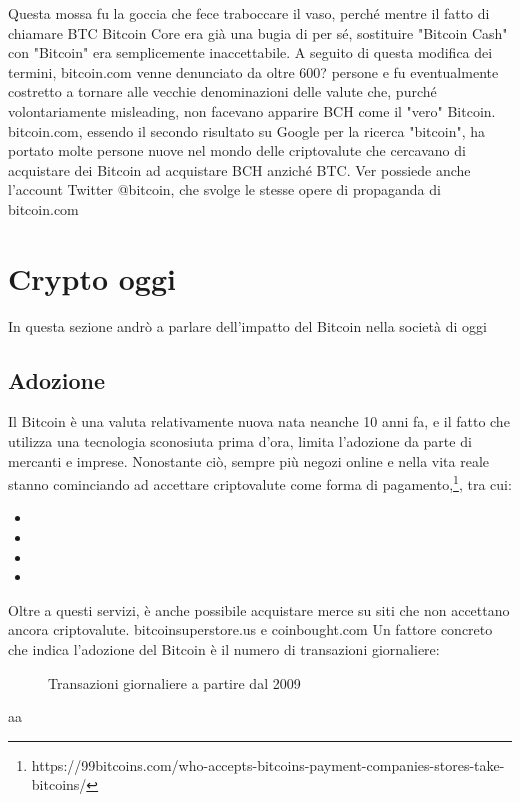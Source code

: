 \documentclass {article}
\begin{document}
{Questa mossa fu la goccia che fece traboccare il vaso, perché mentre il fatto di chiamare BTC Bitcoin Core era già una bugia di per sé, sostituire "Bitcoin Cash" con "Bitcoin" era semplicemente inaccettabile.
A seguito di questa modifica dei termini, bitcoin.com venne denunciato da oltre 600? persone e fu eventualmente costretto a tornare alle vecchie denominazioni delle valute che, purché volontariamente misleading, non facevano apparire BCH come il "vero" Bitcoin.
bitcoin.com, essendo il secondo risultato su Google per la ricerca "bitcoin", ha portato molte persone nuove nel mondo delle criptovalute che cercavano di acquistare dei Bitcoin ad acquistare BCH anziché BTC.
Ver possiede anche l'account Twitter @bitcoin, che svolge le stesse opere di propaganda di bitcoin.com


\section {Crypto oggi}


In questa sezione andrò a parlare dell'impatto del Bitcoin nella società di oggi


\subsection {Adozione}


Il Bitcoin è una valuta relativamente nuova nata neanche 10 anni fa, e il fatto che utilizza una tecnologia sconosiuta prima d'ora, limita l'adozione da parte di mercanti e imprese.
Nonostante ciò, sempre più negozi online e nella vita reale stanno cominciando ad accettare criptovalute come forma di pagamento,\footnote{https://99bitcoins.com/who-accepts-bitcoins-payment-companies-stores-take-bitcoins/}, tra cui:

\begin{itemize}
\item 
\item 
\item 
\item 
\end{itemize}
Oltre a questi servizi, è anche possibile acquistare merce su siti che non accettano ancora criptovalute. bitcoinsuperstore.us e coinbought.com
Un fattore concreto che indica l'adozione del Bitcoin è il numero di transazioni giornaliere:

\vspace {0.5cm}
\begin{figure}[h]
\caption {Transazioni giornaliere a partire dal 2009}
\end{figure}
\vspace {0.2cm}
\noindent
%
aa


}
\end{document}
